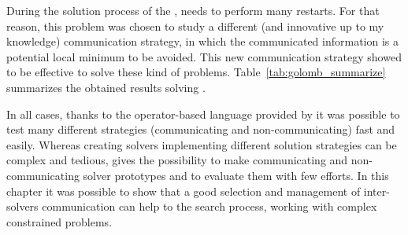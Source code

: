 During the solution process of the \grp{}, \posl{} needs to perform many restarts. For that reason, this problem was chosen to study a different (and innovative up to my knowledge) communication strategy, in which the communicated information is a potential local minimum to be avoided. This new communication strategy showed to be effective to solve these kind of problems. Table~\ref{tab:golomb_summarize} summarizes the obtained results solving \GRP.

\begin{table}[h]
\captionsetup{belowskip=6pt,aboveskip=6pt}
\centering 
\renewcommand{\arraystretch}{1}
\caption{Summarizing results for \GRP{}}
\label{tab:golomb_summarize}
\end{table}

In all cases, thanks to the operator-based language provided by \posl{} it was possible to test many different strategies (communicating and non-communicating) fast and easily. Whereas creating solvers implementing different solution strategies can be complex and tedious, \posl{} gives the possibility to make communicating and non-communicating solver prototypes and to evaluate them with few efforts. In this chapter it was possible to show that a good selection and management of inter-solvers communication can %
help to the search process, working with complex constrained problems.
